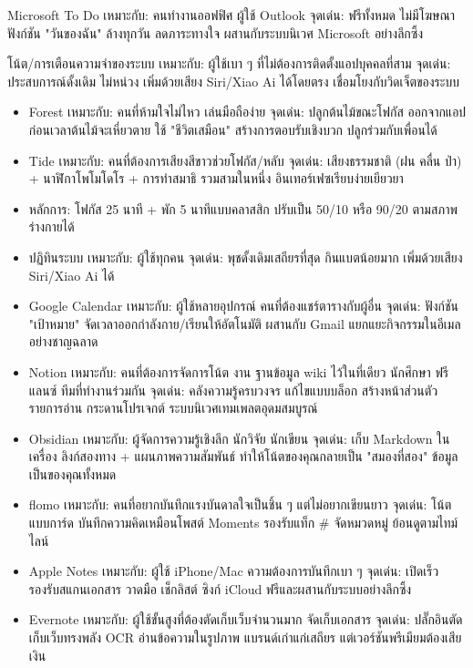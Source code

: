 Microsoft To Do เหมาะกับ: คนทำงานออฟฟิศ ผู้ใช้ Outlook จุดเด่น: ฟรีทั้งหมด ไม่มีโฆษณา ฟังก์ชัน "วันของฉัน" ล้างทุกวัน ลดภาระทางใจ ผสานกับระบบนิเวศ Microsoft อย่างลึกซึ้ง

โน้ต/การเตือนความจำของระบบ เหมาะกับ: ผู้ใช้เบา ๆ ที่ไม่ต้องการติดตั้งแอปบุคคลที่สาม จุดเด่น: ประสบการณ์ดั้งเดิม ไม่หน่วง เพิ่มด้วยเสียง Siri/Xiao Ai ได้โดยตรง เชื่อมโยงกับวิดเจ็ตของระบบ


\begin{itemize}
  \item Forest เหมาะกับ: คนที่ห้ามใจไม่ไหว เล่นมือถือง่าย จุดเด่น: ปลูกต้นไม้ขณะโฟกัส ออกจากแอปก่อนเวลาต้นไม้จะเหี่ยวตาย ใช้ "ชีวิตเสมือน" สร้างการตอบรับเชิงบวก ปลูกร่วมกับเพื่อนได้
  \item Tide เหมาะกับ: คนที่ต้องการเสียงสีขาวช่วยโฟกัส/หลับ จุดเด่น: เสียงธรรมชาติ (ฝน คลื่น ป่า) + นาฬิกาโพโมโดโร + การทำสมาธิ รวมสามในหนึ่ง อินเทอร์เฟซเรียบง่ายเยียวยา
  \item หลักการ: โฟกัส 25 นาที + พัก 5 นาทีแบบคลาสสิก ปรับเป็น 50/10 หรือ 90/20 ตามสภาพร่างกายได้
\end{itemize}


\begin{itemize}
  \item ปฏิทินระบบ เหมาะกับ: ผู้ใช้ทุกคน จุดเด่น: พุชดั้งเดิมเสถียรที่สุด กินแบตน้อยมาก เพิ่มด้วยเสียง Siri/Xiao Ai ได้
  \item Google Calendar เหมาะกับ: ผู้ใช้หลายอุปกรณ์ คนที่ต้องแชร์ตารางกับผู้อื่น จุดเด่น: ฟังก์ชัน "เป้าหมาย" จัดเวลาออกกำลังกาย/เรียนให้อัตโนมัติ ผสานกับ Gmail แยกแยะกิจกรรมในอีเมลอย่างชาญฉลาด
\end{itemize}


\begin{itemize}
  \item Notion เหมาะกับ: คนที่ต้องการจัดการโน้ต งาน ฐานข้อมูล wiki ไว้ในที่เดียว นักศึกษา ฟรีแลนซ์ ทีมที่ทำงานร่วมกัน จุดเด่น: คลังความรู้ครบวงจร แก้ไขแบบบล็อก สร้างหน้าส่วนตัว รายการอ่าน กระดานโปรเจกต์ ระบบนิเวศเทมเพลตอุดมสมบูรณ์
  \item Obsidian เหมาะกับ: ผู้จัดการความรู้เชิงลึก นักวิจัย นักเขียน จุดเด่น: เก็บ Markdown ในเครื่อง ลิงก์สองทาง + แผนภาพความสัมพันธ์ ทำให้โน้ตของคุณกลายเป็น "สมองที่สอง" ข้อมูลเป็นของคุณทั้งหมด
  \item flomo เหมาะกับ: คนที่อยากบันทึกแรงบันดาลใจเป็นชิ้น ๆ แต่ไม่อยากเขียนยาว จุดเด่น: โน้ตแบบการ์ด บันทึกความคิดเหมือนโพสต์ Moments รองรับแท็ก \# จัดหมวดหมู่ ย้อนดูตามไทม์ไลน์
  \item Apple Notes เหมาะกับ: ผู้ใช้ iPhone/Mac ความต้องการบันทึกเบา ๆ จุดเด่น: เปิดเร็ว รองรับสแกนเอกสาร วาดมือ เช็กลิสต์ ซิงก์ iCloud ฟรีและผสานกับระบบอย่างลึกซึ้ง
  \item Evernote เหมาะกับ: ผู้ใช้ขั้นสูงที่ต้องตัดเก็บเว็บจำนวนมาก จัดเก็บเอกสาร จุดเด่น: ปลั๊กอินตัดเก็บเว็บทรงพลัง OCR อ่านข้อความในรูปภาพ แบรนด์เก่าแก่เสถียร แต่เวอร์ชันพรีเมียมต้องเสียเงิน
\end{itemize}

